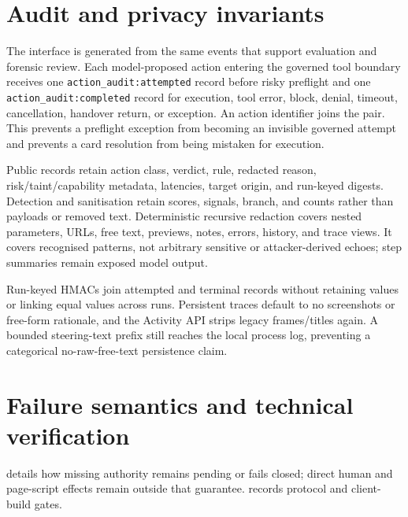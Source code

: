 \section{Audit and privacy invariants}

The interface is generated from the same events that support evaluation and
forensic review. Each model-proposed action entering the governed tool
boundary receives one \texttt{action\_audit:attempted} record before risky
preflight and one \texttt{action\_audit:completed} record for execution, tool
error, block, denial, timeout, cancellation, handover return, or exception. An
action identifier joins the pair. This prevents a preflight exception from
becoming an invisible governed attempt and prevents a card resolution from
being mistaken for execution.

Public records retain action class, verdict, rule, redacted reason,
risk/taint/capability metadata, latencies, target origin, and run-keyed digests.
Detection and sanitisation retain scores, signals, branch, and counts rather
than payloads or removed text. Deterministic recursive redaction covers nested
parameters, URLs, free text, previews, notes, errors, history, and trace views.
It covers recognised patterns, not arbitrary sensitive or attacker-derived
echoes; step summaries remain exposed model output.

Run-keyed HMACs join attempted and terminal records without retaining values or
linking equal values across runs. Persistent traces default to no screenshots
or free-form rationale, and the Activity API strips legacy frames/titles again.
A bounded steering-text prefix still reaches the local process log, preventing
a categorical no-raw-free-text persistence claim.

\section{Failure semantics and technical verification}

 details how missing authority remains pending or
fails closed; direct human and page-script effects remain outside that
guarantee.  records protocol and
client-build gates.
